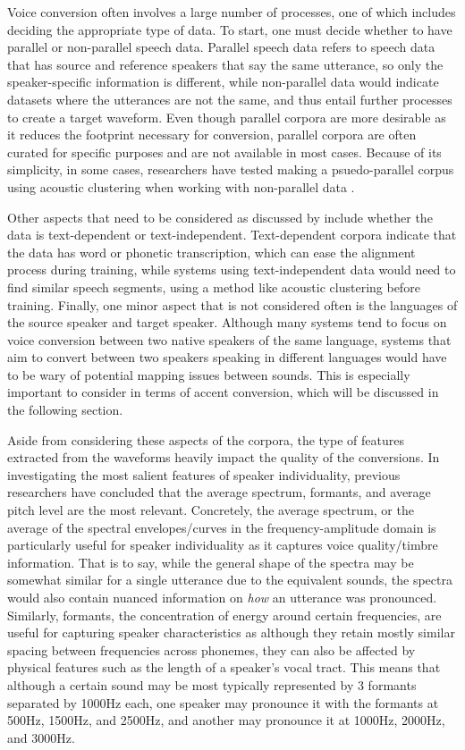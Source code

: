 \documentclass
[
    a4paper,
    twoside,
    12pt,
]
{report}
\begin{document}
Voice conversion often involves a large number of processes, one of
which includes deciding the appropriate type of data. To start, one must
decide whether to have parallel or non-parallel speech data. Parallel
speech data refers to speech data that has source and reference speakers
that say the same utterance, so only the speaker-specific information is
different, while non-parallel data would indicate datasets where the
utterances are not the same, and thus entail further processes to create
a target waveform. Even though parallel corpora are more desirable as it
reduces the footprint necessary for conversion, parallel corpora are
often curated for specific purposes and are not available in most cases.
Because of its simplicity, in some cases, researchers have tested making
a psuedo-parallel corpus using acoustic clustering when working with
non-parallel data \parencite{lorenzo-trueba2018, sundermann2006}.

Other aspects that need to be considered as discussed by
\textcite{mohammadi2017} include whether the data is text-dependent or
text-independent. Text-dependent corpora indicate that the data has word
or phonetic transcription, which can ease the alignment process during
training, while systems using text-independent data would need to find
similar speech segments, using a method like acoustic clustering before
training. Finally, one minor aspect that is not considered often is the
languages of the source speaker and target speaker. Although many
systems tend to focus on voice conversion between two native speakers of
the same language, systems that aim to convert between two speakers
speaking in different languages would have to be wary of potential
mapping issues between sounds. This is especially important to consider
in terms of accent conversion, which will be discussed in the following
section.

Aside from considering these aspects of the corpora, the type of
features extracted from the waveforms heavily impact the quality of the
conversions. In investigating the most salient features of speaker
individuality, previous researchers have concluded that the average
spectrum, formants, and average pitch level are the most relevant.
Concretely, the average spectrum, or the average of the spectral
envelopes/curves in the frequency-amplitude domain is particularly
useful for speaker individuality as it captures voice quality/timbre
information. That is to say, while the general shape of the spectra may
be somewhat similar for a single utterance due to the equivalent sounds,
the spectra would also contain nuanced information on \emph{how} an
utterance was pronounced. Similarly, formants, the concentration of
energy around certain frequencies, are useful for capturing speaker
characteristics as although they retain mostly similar spacing between
frequencies across phonemes, they can also be affected by physical
features such as the length of a speaker's vocal tract. This means that
although a certain sound may be most typically represented by 3 formants
separated by 1000Hz each, one speaker may pronounce it with the formants
at 500Hz, 1500Hz, and 2500Hz, and another may pronounce it at 1000Hz,
2000Hz, and 3000Hz.
\end{document}
